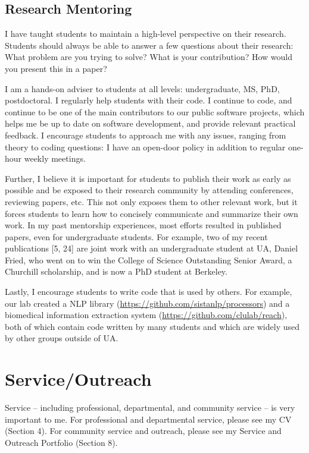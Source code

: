 \documentclass[10pt]{article}
\begin{document}
\subsection*{Research Mentoring} 

I have taught students to maintain a high-level perspective on their research. Students should always be able to answer a few questions about their research: What problem are you trying to solve? What is your contribution? How would you present this in a paper? 

I am a hands-on adviser to students at all levels: undergraduate, MS, PhD, postdoctoral. I regularly help students with their code. I continue to code, and continue to be one of the main contributors to our public software projects, which helps me be up to date on software development, and provide relevant practical feedback. I encourage students to approach me with any issues, ranging from theory to coding questions: I have an open-door policy in addition to regular one-hour weekly meetings. 

Further, I believe it is important for students to publish their work as early as possible and be exposed to their research community by attending conferences, reviewing papers, etc. This not only exposes them to other relevant work, but it forces students to learn how to concisely communicate and summarize their own work. In my past mentorship experiences, most efforts resulted in published papers, even for undergraduate students. For example, two of my recent publications [5, 24] are joint work with an undergraduate student at UA, Daniel Fried, who went on to win the College of Science Outstanding Senior Award, a Churchill scholarship, and is now a PhD student at Berkeley. 

Lastly, I encourage students to write code that is used by others. For example, our lab created a NLP library (\url{https://github.com/sistanlp/processors}) and a biomedical information extraction system (\url{https://github.com/clulab/reach}), both of which contain code written by many students and which are widely used by other groups outside of UA.

\section{Service/Outreach}

Service -- including professional, departmental, and community service -- is very important to me. 
For professional and departmental service, please see my CV (Section 4).
For community service and outreach, please see my Service and Outreach Portfolio (Section 8).
\end{document}
